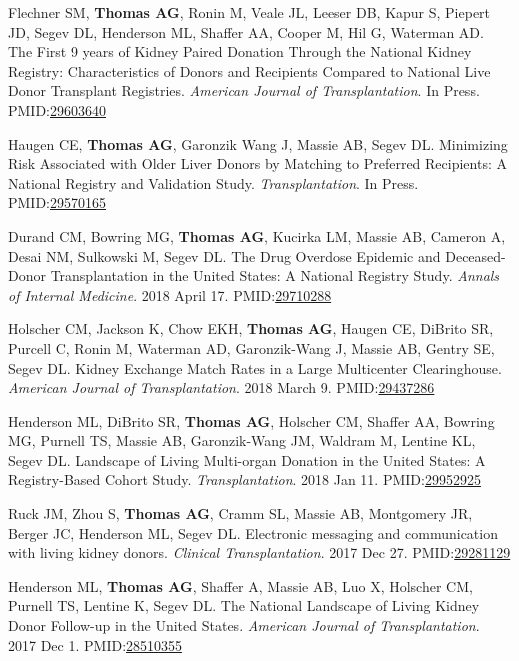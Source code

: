 \documentclass[10pt]{article}
\makeatletter
\newlength{\bibhang}
\newlength{\bibsep}
 {\@listi \global\bibsep\itemsep \global\advance\bibsep by\parsep}
\newenvironment{bibenum*}
  {\renewcommand\labelenumi{[\theenumi]}%
   \etaremune[
     topsep=0pt,
     itemsep=\bibsep,
     parsep=0pt,partopsep=0pt,
     itemindent=-\bibhang,
     leftmargin={\bibhang+\widthof{[999]}}]}
  {\endetaremune}
\newcommand{\pmid}[1]{PMID:\href{https://www.ncbi.nlm.nih.gov/pubmed/#1}{#1}}
\makeatother
\begin{document}
\begin{bibenum*}
\item Flechner SM, \textbf{Thomas AG}, Ronin M,
  Veale JL, Leeser DB, Kapur S, Piepert JD, Segev DL, Henderson ML,
  Shaffer AA, Cooper M, Hil G, Waterman AD.
  The First 9 years of Kidney Paired Donation Through the National Kidney
  Registry: Characteristics of Donors and Recipients Compared to National Live
  Donor Transplant Registries.
  \emph{American Journal of Transplantation}. In Press.
  \pmid{29603640} 

\item Haugen CE, \textbf{Thomas AG}, Garonzik Wang J, Massie AB,
  Segev DL. Minimizing Risk Associated with Older Liver Donors by
  Matching to Preferred Recipients: A National Registry and
  Validation Study.
  \emph{Transplantation}. In Press.
  \\\pmid{29570165} 

\item Durand CM\dag, Bowring MG\dag, \textbf{Thomas AG}, Kucirka LM,
  Massie AB, Cameron A, Desai NM, Sulkowski M, Segev DL.
  The Drug Overdose Epidemic and Deceased-Donor Transplantation
  in the United States: A National Registry Study.
  \emph{Annals of Internal Medicine}. 2018 April 17.
  \pmid{29710288} 

\item Holscher CM, Jackson K, Chow EKH, \textbf{Thomas AG}, Haugen CE,
  DiBrito SR, Purcell C, Ronin M, Waterman AD, Garonzik-Wang J, Massie AB,
  Gentry SE, Segev DL. Kidney Exchange Match Rates in a Large
  Multicenter Clearinghouse.
  \emph{American Journal of Transplantation}. 2018 March 9.
  \pmid{29437286} 

\item Henderson ML\dag, DiBrito SR\dag, \textbf{Thomas AG}, Holscher CM,
  Shaffer AA, Bowring MG, Purnell TS, Massie AB, Garonzik-Wang JM,
  Waldram M, Lentine KL, Segev DL.  Landscape of Living Multi-organ
  Donation in the United States: A Registry-Based Cohort Study.
  \emph{Transplantation}. 2018 Jan 11.
  \pmid{29952925} 

\item Ruck JM, Zhou S, \textbf{Thomas AG}, Cramm SL, Massie AB,
  Montgomery JR, Berger JC, Henderson ML, Segev DL.
  Electronic messaging and communication with living kidney donors.
  \emph{Clinical Transplantation}. 2017 Dec 27.
  \pmid{29281129} 

\item Henderson ML\dag, \textbf{Thomas AG\dag}, Shaffer A, Massie AB, Luo X,
  Holscher CM, Purnell TS, Lentine K, Segev DL. The National Landscape
  of Living Kidney Donor Follow-up in the United States.
  \emph{American Journal of Transplantation}. 2017 Dec 1.
  \pmid{28510355} 


\end{bibenum*}
\end{document}
